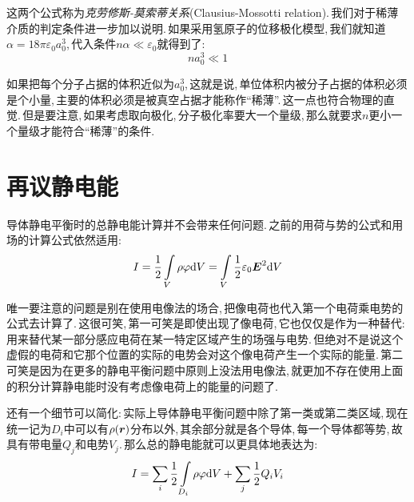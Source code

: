 这两个公式称为\emph{克劳修斯-莫索蒂关系}(Clausius-Mossotti relation).\,我们对于稀薄介质的判定条件进一步加以说明.\,如果采用氢原子的位移极化模型,\,我们就知道$\alpha =18\pi \varepsilon_0 a_0^3$,\,代入条件$n\alpha\ll \varepsilon_0$就得到了:
\[na_0^3\ll 1\]

如果把每个分子占据的体积近似为$a_0^3$,\,这就是说,\,单位体积内被分子占据的体积必须是个小量,\,主要的体积必须是被真空占据才能称作``稀薄''.\,这一点也符合物理的直觉.\,但是要注意,\,如果考虑取向极化,\,分子极化率要大一个量级,\,那么就要求$n$更小一个量级才能符合``稀薄''的条件.

\section{再议静电能}

导体静电平衡时的总静电能计算并不会带来任何问题.\,之前的用荷与势的公式和用场的计算公式依然适用:
\[I=\frac{1}{2}\int\limits_{V}\rho \varphi \textrm{d} V=\int\limits_{V}\frac{1}{2}\varepsilon_0\boldsymbol{E}^2\textrm{d} V\]

唯一要注意的问题是别在使用电像法的场合,\,把像电荷也代入第一个电荷乘电势的公式去计算了.\,这很可笑,\,第一可笑是即使出现了像电荷,\,它也仅仅是作为一种替代:\,用来替代某一部分感应电荷在某一特定区域产生的场强与电势.\,但绝对不是说这个虚假的电荷和它那个位置的实际的电势会对这个像电荷产生一个实际的能量.\,第二可笑是因为在更多的静电平衡问题中原则上没法用电像法,\,就更加不存在使用上面的积分计算静电能时没有考虑像电荷上的能量的问题了.

还有一个细节可以简化:\,实际上导体静电平衡问题中除了第一类或第二类区域,\,现在统一记为$D_i$中可以有$\rho(\boldsymbol{r})$分布以外,\,其余部分就是各个导体,\,每一个导体都等势,\,故具有带电量$Q_j$和电势$V_j$.\,那么总的静电能就可以更具体地表达为:
\[I=\sum_i \frac{1}{2}\int\limits_{D_i}\rho \varphi \textrm{d} V+\sum_j \frac{1}{2}Q_iV_i\]

